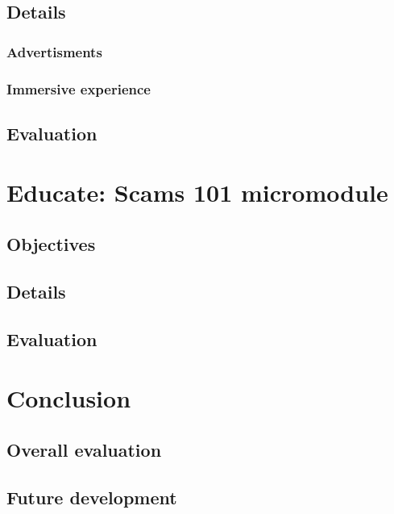 \documentclass[a4paper]{article}
\begin{document}
\subsection{Details}
\subsubsection{Advertisments}
\subsubsection{Immersive experience}
\subsection{Evaluation}

\section{Educate: Scams 101 micromodule}
\subsection{Objectives}
\subsection{Details}
\subsection{Evaluation}

\section{Conclusion}
\subsection{Overall evaluation}
\subsection{Future development}

\newpage

\nocite{*} \printbibliography[heading=bibintoc,title={References}]

\newpage


\begin{appendices}
\end{appendices}


\end{document}
